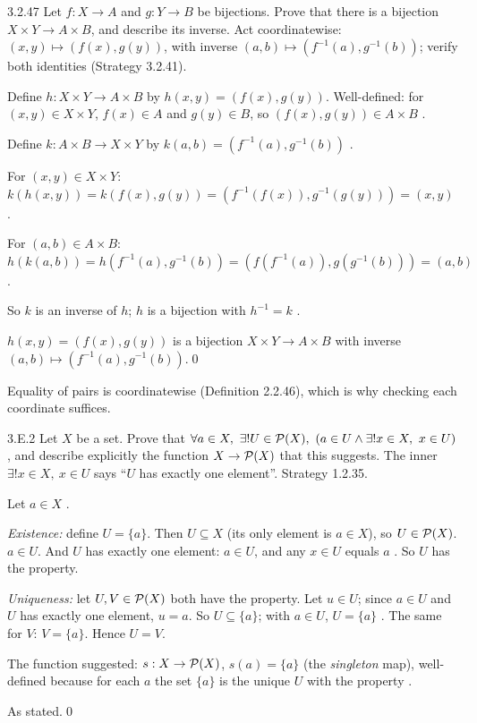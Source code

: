 \begin{bookex}[essential]{3.2.47}
Let $f:X\to A$ and $g:Y\to B$ be bijections. Prove that there is a bijection $X\times Y\to A\times B$, and describe its inverse.
\solution
\plan Act coordinatewise: $(x,y)\mapsto(f(x),g(y))$, with inverse $(a,b)\mapsto(f^{-1}(a),g^{-1}(b))$; verify both identities (Strategy 3.2.41).
\begin{steps}
\item Define $h:X\times Y\to A\times B$ by $h(x,y)=(f(x),g(y))$. Well-defined: for $(x,y)\in X\times Y$, $f(x)\in A$ and $g(y)\in B$, so $(f(x),g(y))\in A\times B$ .
\item Define $k:A\times B\to X\times Y$ by $k(a,b)=(f^{-1}(a),g^{-1}(b))$ .
\item For $(x,y)\in X\times Y$: $k(h(x,y))=k(f(x),g(y))=(f^{-1}(f(x)),g^{-1}(g(y)))=(x,y)$ .
\item For $(a,b)\in A\times B$: $h(k(a,b))=h(f^{-1}(a),g^{-1}(b))=(f(f^{-1}(a)),g(g^{-1}(b)))=(a,b)$.
\item So $k$ is an inverse of $h$; $h$ is a bijection with $h^{-1}=k$ .
\end{steps}
\conclusion $h(x,y)=(f(x),g(y))$ is a bijection $X\times Y\to A\times B$ with inverse $(a,b)\mapsto(f^{-1}(a),g^{-1}(b))$.\qed
\begin{compare}
\item Equality of pairs is coordinatewise (Definition 2.2.46), which is why checking each coordinate suffices.
\end{compare}
\end{bookex}


\begin{bookex}[recommended]{3.E.2}
Let $X$ be a set. Prove that $\forall a\in X,\ \exists!U\in\PS(X),\ (a\in U\wedge\exists!x\in X,\ x\in U)$, and describe explicitly the function $X\to\mathcal{P}(X)$ that this suggests.
\solution
\given The inner $\exists!x\in X,\ x\in U$ says ``$U$ has exactly one element''. Strategy 1.2.35.
\begin{steps}
\item Let $a\in X$ .
\item \emph{Existence:} define $U=\{a\}$. Then $U\subseteq X$ (its only element is $a\in X$), so $U\in\mathcal{P}(X)$. $a\in U$. And $U$ has exactly one element: $a\in U$, and any $x\in U$ equals $a$ . So $U$ has the property.
\item \emph{Uniqueness:} let $U,V\in\mathcal{P}(X)$ both have the property. Let $u\in U$; since $a\in U$ and $U$ has exactly one element, $u=a$. So $U\subseteq\{a\}$; with $a\in U$, $U=\{a\}$ . The same for $V$: $V=\{a\}$. Hence $U=V$.
\item The function suggested: $s:X\to\mathcal{P}(X)$, $s(a)=\{a\}$ (the \emph{singleton} map), well-defined because for each $a$ the set $\{a\}$ is the unique $U$ with the property .
\end{steps}
\conclusion As stated.\qed
\end{bookex}

